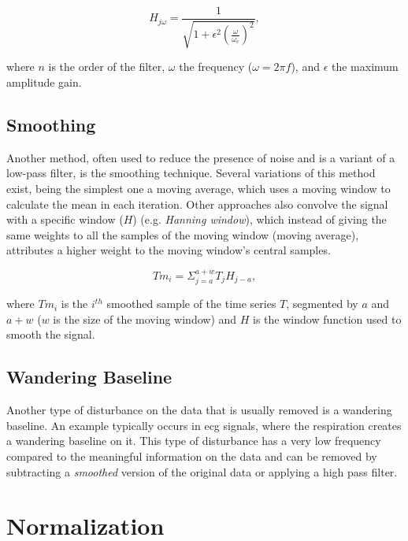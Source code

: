 \begin{equation}
H_{j\omega} = \frac{1}{\sqrt{1+\epsilon^2 \left(\frac{\omega}{\omega_c}\right)^2}},
\end{equation}

where $n$ is the order of the filter, $\omega$ the frequency ($\omega=2\pi f$), and $\epsilon$ the maximum amplitude gain. 


\subsection{Smoothing}
\label{subsec:smooth}

Another method, often used to reduce the presence of noise and is a variant of a low-pass filter, is the smoothing technique. Several variations of this method exist, being the simplest one a moving average, which uses a moving window to calculate the mean in each iteration. Other approaches also convolve the signal with a specific window ($H$) (e.g. \textit{Hanning window}), which instead of giving the same weights to all the samples of the moving window (moving average), attributes a higher weight to the moving window's central samples.
 
\begin{equation}
Tm_i = \Sigma_{j=a}^{a+w} T_jH_{j-a},
\end{equation}

where $Tm_i$ is the $i^{th}$ smoothed sample of the time series $T$, segmented by $a$ and $a+w$ ($w$ is the size of the moving window) and $H$ is the window function used to smooth the signal.

\subsection{Wandering Baseline}
\label{subsec:w_baseline}

Another type of disturbance on the data that is usually removed is a wandering baseline. An example typically occurs in \gls{ecg} signals, where the respiration creates a wandering baseline on it. This type of disturbance has a very low frequency compared to the meaningful information on the data and can be removed by subtracting a \textit{smoothed} version of the original data or applying a high pass filter.

\section{Normalization} 
\label{sec:normalize}

